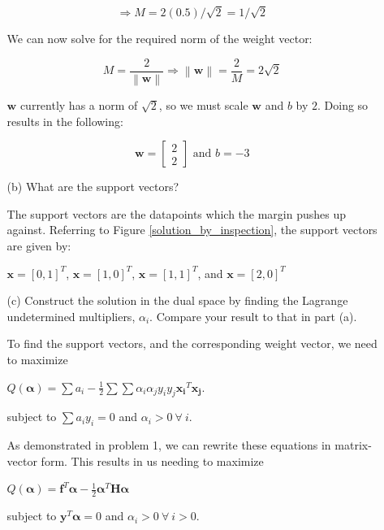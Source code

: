 \documentclass[fleqn]{article}
\newcommand{\norm}[1]{\left \lVert #1 \right \rVert}
\begin{document}
\begin{enumerate}
\begin{enumerate}
		\begin{equation*}
			\Rightarrow M = 2(0.5)/\sqrt{2} = 1/\sqrt{2} 
		\end{equation*}
		
		We can now solve for the required norm of the weight vector:
		
		\begin{equation*}
			M = \frac{2}{\norm{\mathbf{w}}} \Rightarrow \norm{\mathbf{w}} = \frac{2}{M} = 2\sqrt{2}
		\end{equation*}
		
		$\mathbf{w}$ currently has a norm of $\sqrt{2}$, so we must scale $\mathbf{w}$ and $b$ by $2$. Doing so results in the following:
		
		\begin{equation*}
			\mathbf{w} = \begin{bmatrix} 2 \\ 2 \end{bmatrix} \text{ and } b = -3
		\end{equation*}	
		
		\item[(b)] What are the support vectors?
		
		The support vectors are the datapoints which the margin pushes up against. Referring to Figure \ref{solution_by_inspection}, the support vectors are given by:
		
		$\mathbf{x} = [0, 1]^T$, $\mathbf{x} = [1, 0]^T$, $\mathbf{x} = [1, 1]^T$, and $\mathbf{x} = [2, 0]^T$
		
		\item[(c)] Construct the solution in the dual space by finding the Lagrange undetermined multipliers, $\alpha_i$. Compare your result to that in \newline part (a).
		
		To find the support vectors, and the corresponding weight vector, we need to maximize		
		
		$Q(\boldsymbol{\alpha}) = \sum{a_i} - \frac{1}{2}\sum{\sum{\alpha_i\alpha_jy_iy_j\mathbf{x_i}^T\mathbf{x_j}}}$.
	
	subject to $\sum{a_iy_i} = 0$ and $\alpha_i > 0\ \forall\ i$.
	
		As demonstrated in problem 1, we can rewrite these equations in matrix-vector form. This results in us needing to maximize
		
		$Q(\boldsymbol{\alpha}) = \mathbf{f}^T\boldsymbol{\alpha} - \frac{1}{2}\boldsymbol{\alpha}^T\mathbf{H}\boldsymbol{\alpha}$
		
		subject to $\mathbf{y}^T\boldsymbol{\alpha} = 0$ and $\alpha_i > 0\ \forall\ i > 0$.
		

\end{enumerate}
\end{enumerate}
\end{document}
